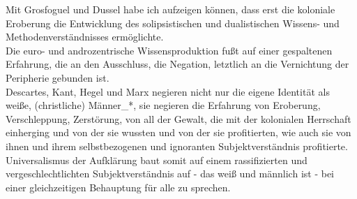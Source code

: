 \noindent Mit Grosfoguel und Dussel habe ich aufzeigen können, dass erst die koloniale
Eroberung die Entwicklung des solipsistischen und dualistischen Wissens- und
Methodenverständnisses ermöglichte. \\
Die euro- und androzentrische
Wissensproduktion fußt auf einer gespaltenen Erfahrung, die an den Ausschluss,
die Negation, letztlich an die Vernichtung der Peripherie gebunden ist.\\
Descartes, Kant, Hegel und Marx negieren nicht nur die eigene Identität als
weiße, (christliche)\footnotemark {} Männer\_*, sie
negieren die Erfahrung von Eroberung, Verschleppung, Zerstörung, von all der
Gewalt, die mit der kolonialen Herrschaft einherging und von der sie wussten
und von der sie profitierten, wie auch sie von ihnen und ihrem selbstbezogenen
und ignoranten Subjektverständnis profitierte. \\
Universalismus der Aufklärung
baut somit auf einem rassifizierten und vergeschlechtlichten Subjektverständnis
auf - das weiß und männlich ist - bei einer gleichzeitigen Behauptung für alle
zu sprechen.
